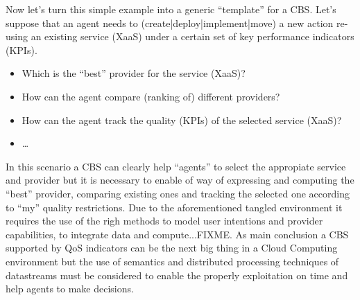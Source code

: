 Now let's turn this simple example into a generic ``template'' for a CBS. Let's suppose that an agent 
needs to (create|deploy|implement|move) a new action re-using an existing service (XaaS) 
under a certain set of key performance indicators (KPIs).
\begin{itemize}
 \item Which is the ``best'' provider for the service (XaaS)? 
 \item How can the agent compare (ranking of) different providers? 
 \item How can the agent track the quality (KPIs) of the selected service (XaaS)?
  \item \ldots
\end{itemize}

In this scenario a CBS can clearly help ``agents'' to select the appropiate service and provider 
but it is necessary to enable of way of expressing and computing the ``best'' provider, comparing 
existing ones and tracking the selected one according to ``my'' quality restrictions. Due to 
the aforementioned tangled environment it requires the use of the righ methods to model user intentions and 
provider capabilities, to integrate data and compute...FIXME. As main conclusion a CBS supported by QoS indicators 
can be the next big thing in a Cloud Computing environment but the use of semantics and 
distributed processing techniques of datastreams must be considered to enable the properly 
exploitation on time and help agents to make decisions.








